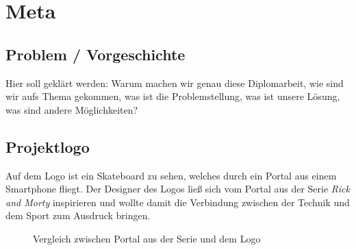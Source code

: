 \chapter{Meta}

\section{Problem / Vorgeschichte}

Hier soll geklärt werden: Warum machen wir genau diese Diplomarbeit, wie sind wir aufs Thema gekommen,
was ist die Problemstellung, was ist unsere Lösung, was sind andere Möglichkeiten?

\section{Projektlogo}

Auf dem Logo ist ein Skateboard zu sehen, welches durch ein Portal aus einem Smartphone fliegt.
Der Designer des Logos ließ sich vom Portal aus der Serie \textit{Rick and Morty} inspirieren und wollte damit die Verbindung zwischen
der Technik und dem Sport zum Ausdruck bringen.



\begin{figure}[H]
    \centering
    \hfill
    \hfill
    \hfill
    \caption{Vergleich zwischen Portal aus der Serie und dem Logo}
\end{figure}